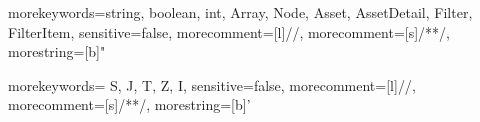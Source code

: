 {
  morekeywords={string, boolean, int, Array, Node, Asset, AssetDetail, Filter, FilterItem},
  sensitive=false, %
  morecomment=[l]{//}, %
  morecomment=[s]{/*}{*/}, %
  morestring=[b]" %
}

{
	morekeywords={ S, J, T, Z, I},
	sensitive=false, %
	morecomment=[l]{//}, %
	morecomment=[s]{/*}{*/}, %
	morestring=[b]' %
}

